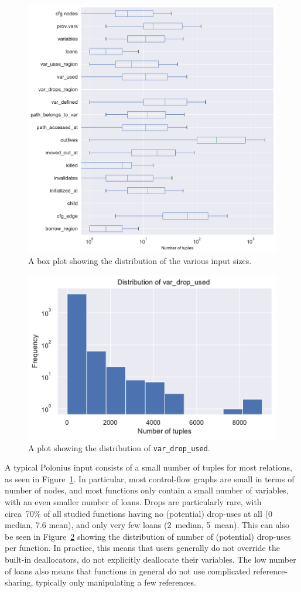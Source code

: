 \documentclass[11pt,a4paper,twoside,openany]{report}
\newcommand{\InDatalog}[1]{\texttt{#1}}
\begin{document}
{\begin{figure}
  \includegraphics[width=0.9\linewidth]{Graphs/input_sizes_boxplot.pdf}
  \caption[Distribution of Polonius Input Tuple Sizes]{A box plot showing the
    distribution of the various input sizes.}
  \label{fig:input-sizes}
\end{figure}

\begin{figure}
  \includegraphics[width=0.5\linewidth]{Graphs/var_drop_used_size_dist.pdf}
  \caption[Distribution of Input Sizes for the \InDatalog{var_drop_used} Fact]{A
    plot showing the distribution of \InDatalog{var_drop_used}.}
  \label{fig:input-var-drop-used}
\end{figure}

A typical Polonius input consists of a small number of tuples for most
relations, as seen in Figure~\ref{fig:input-sizes}. In particular, most
control-flow graphs are small in terms of number of nodes, and most functions
only contain a small number of variables, with an even smaller number of loans.
Drops are particularly rare, with circa~70\% of all studied functions having
no (potential) drop-uses at all (0 median, 7.6 mean), and only very few
loans (2~median, 5~mean). This can also be seen in
Figure~\ref{fig:input-var-drop-used} showing the distribution of number of
(potential) drop-uses per function. In practice, this means that users generally
do not override the built-in deallocators, do not explicitly deallocate their
variables. The low number of loans also means that functions in general do not
use complicated reference-sharing, typically only manipulating a few references.

}
\end{document}
